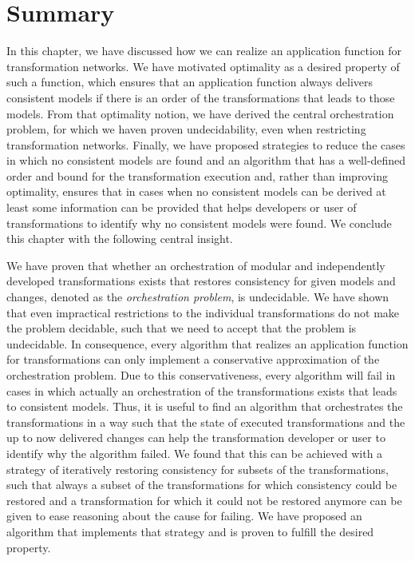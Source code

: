 \section{Summary}

In this chapter, we have discussed how we can realize an application function for transformation networks.
We have motivated optimality as a desired property of such a function, which ensures that an application function always delivers consistent models if there is an order of the transformations that leads to those models. 
From that optimality notion, we have derived the central orchestration problem, for which we haven proven undecidability, even when restricting transformation networks.
Finally, we have proposed strategies to reduce the cases in which no consistent models are found and an algorithm that has a well-defined order and bound for the transformation execution and, rather than improving optimality, ensures that in cases when no consistent models can be derived at least some information can be provided that helps developers or user of transformations to identify why no consistent models were found.
We conclude this chapter with the following central insight.

\begin{insight}[Orchestration]
    We have proven that whether an orchestration of modular and independently developed transformations exists that restores consistency for given models and changes, denoted as the \emph{orchestration problem}, is undecidable.
    We have shown that even impractical restrictions to the individual transformations do not make the problem decidable, such that we need to accept that the problem is undecidable.
    In consequence, every algorithm that realizes an application function for transformations can only implement a conservative approximation of the orchestration problem.
    Due to this conservativeness, every algorithm will fail in cases in which actually an orchestration of the transformations exists that leads to consistent models.
    Thus, it is useful to find an algorithm that orchestrates the transformations in a way such that the state of executed transformations and the up to now delivered changes can help the transformation developer or user to identify why the algorithm failed.
    We found that this can be achieved with a strategy of iteratively restoring consistency for subsets of the transformations, such that always a subset of the transformations for which consistency could be restored and a transformation for which it could not be restored anymore can be given to ease reasoning about the cause for failing.
    We have proposed an algorithm that implements that strategy and is proven to fulfill the desired property.
\end{insight}